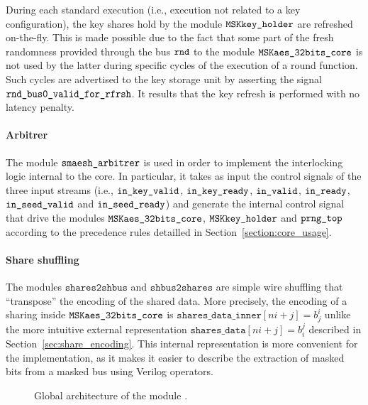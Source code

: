 \documentclass{scrartcl}
\begin{document}
During each standard execution (i.e., execution not related to a key
configuration), the key shares hold by the module $\texttt{MSKkey\_holder}$ are refreshed
on-the-fly. This is made possible due to the fact that some part of the fresh
randomness provided through the bus $\texttt{rnd}$ to the module $\texttt{MSKaes\_32bits\_core}$ is
not used by the latter during specific cycles of the execution of a round
function. Such cycles are advertised to the key storage unit by asserting the signal
$\texttt{rnd\_bus0\_valid\_for\_rfrsh}$. It results that the key refresh is performed with no latency penalty.  

\paragraph{Arbitrer}
The module $\texttt{smaesh\_arbitrer}$ is used in order to implement the interlocking
logic internal to the core.  In particular, it takes as input the control
signals of the three input streams (i.e., $\texttt{in\_key\_valid}$, $\texttt{in\_key\_ready}$,
$\texttt{in\_valid}$, $\texttt{in\_ready}$, $\texttt{in\_seed\_valid}$ and $\texttt{in\_seed\_ready}$) and
generate the internal control signal that drive the modules $\texttt{MSKaes\_32bits\_core}$,
$\texttt{MSKkey\_holder}$ and $\texttt{prng\_top}$ according to the precedence rules detailled in
Section~\ref{section:core_usage}. 

\paragraph{Share shuffling}
The modules $\texttt{shares2shbus}$ and $\texttt{shbus2shares}$ are simple wire
shuffling that ``transpose'' the encoding of the shared data.
More precisely, the encoding of a sharing inside $\texttt{MSKaes\_32bits\_core}$
is $\texttt{shares\_data\_inner}\left[ ni+j\right] = b_j^i$ unlike the more
intuitive external representation $\texttt{shares\_data}\left[ ni+j\right] =
b_i^j$ described in Section~\ref{sec:share_encoding}.
This internal representation is more convenient for the implementation, as it
makes it easier to describe the extraction of masked bits from a masked bus
using Verilog operators.

\begin{figure}
    \centering
    \resizebox{\textwidth}{!}{
        \begin{tikzpicture}
            
        \end{tikzpicture}
    }
    \caption{Global architecture of the module \topName.}
    \label{fig:smaesh_top_module}
\end{figure}
\end{document}
